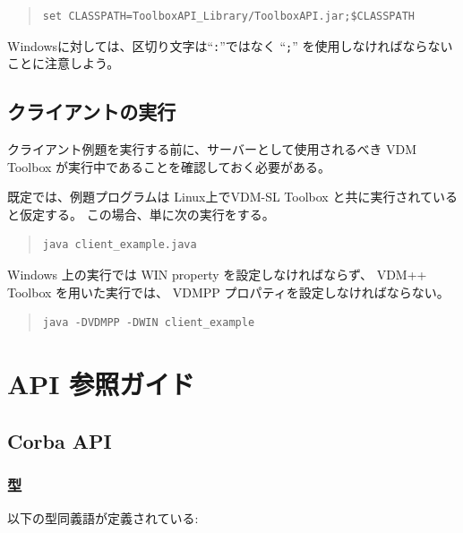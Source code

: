 \documentclass[\pformat,12pt]{jarticle}
\begin{document}
\begin{quote}
\begin{verbatim}
set CLASSPATH=ToolboxAPI_Library/ToolboxAPI.jar;$CLASSPATH
\end{verbatim}  %
\end{quote}

Windowsに対しては、区切り文字は``{\tt :}''ではなく ``{\tt ;}'' を使用しなければならないことに注意しよう。

\subsection{クライアントの実行}

クライアント例題を実行する前に、サーバーとして使用されるべき VDM Toolbox が実行中であることを確認しておく必要がある。

既定では、例題プログラムは Linux上でVDM-SL Toolbox と共に実行されていると仮定する。
この場合、単に次の実行をする。

\begin{quote}
\begin{verbatim}
java client_example.java
\end{verbatim}  
\end{quote}

Windows 上の実行では WIN property を設定しなければならず、 VDM++ Toolbox を用いた実行では、 VDMPP プロパティを設定しなければならない。

\begin{quote}
\begin{verbatim}
java -DVDMPP -DWIN client_example
\end{verbatim}  
\end{quote}

\newpage




\section{API 参照ガイド}\label{refguide}

\subsection{Corba API}\label{ref:corbaapi}


\subsubsection{型}\label{ref:corbatypes}

以下の型同義語が定義されている:
\end{document}
